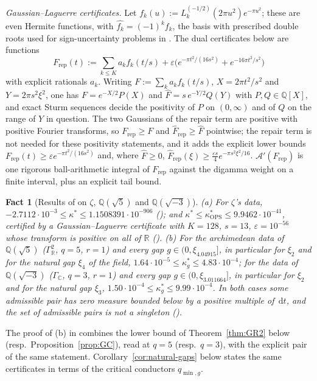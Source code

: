 \documentclass[11pt]{amsart}
\newcommand{\RR}{\mathbb R}
\newcommand{\QQ}{\mathbb Q}
\newcommand{\dd}{\,\mathrm d}
\newcommand{\eps}{\varepsilon}
\newcommand{\FT}[1]{\widehat{#1}}
\newcommand{\hF}{\widehat F}
\newcommand{\xin}[1]{\xi_{#1}}
\newcommand{\GR}{\Gamma_{\mathbb R}}
\newcommand{\GC}{\Gamma_{\mathbb C}}
\newcommand{\Arch}{\mathcal A}
\newcommand{\kstar}{\kappa^{*}}
\newcommand{\kOPS}{\kappa^{*}_{\mathrm{OPS}}}
\newcommand{\Frep}{F_{\mathrm{rep}}}
\newtheorem{fact}[theorem]{Fact}
\theoremstyle{definition}
\theoremstyle{remark}
\numberwithin{equation}{section}
\begin{document}
\emph{Gaussian--Laguerre certificates.} Let $f_k(u):=L_k^{(-1/2)}(2\pi u^2)e^{-\pi u^2}$; these are even Hermite functions, with
$\widehat{f_k}=(-1)^kf_k$, the basis with prescribed double roots used for sign-uncertainty problems in \cite{CG19}. The dual
certificates below are functions
\[
\Frep(t):=\sum_{k\le K}a_kf_k(t/s)+\eps\bigl(e^{-\pi t^2/(16s^2)}+e^{-16\pi t^2/s^2}\bigr)
\]
with explicit rationals $a_k$. Writing $F:=\sum_ka_kf_k(t/s)$, $X=2\pi t^2/s^2$ and $Y=2\pi s^2\xi^2$, one has $F=e^{-X/2}P(X)$ and
$\hF=s\,e^{-Y/2}Q(Y)$ with $P,Q\in\QQ[X]$, and exact Sturm sequences decide the positivity of $P$ on $(0,\infty)$ and of $Q$ on the
range of $Y$ in question. The two Gaussians of the repair term are positive with positive Fourier transforms, so $\Frep\ge F$
and $\FT F_{\mathrm{rep}}\ge\hF$ pointwise; the repair term is not needed for these positivity statements, and it adds the explicit
lower bounds $\Frep(t)\ge\eps e^{-\pi t^2/(16s^2)}$ and, where $\hF\ge0$, $\FT F_{\mathrm{rep}}(\xi)\ge\frac{\eps s}4e^{-\pi s^2\xi^2/16}$.
$\Arch'(\Frep)$ is one rigorous ball-arithmetic integral of $\Frep$ against the digamma weight on a finite interval, plus an
explicit tail bound.

\begin{fact}[Results of \cite{PaperI} on $\zeta$, $\QQ(\sqrt5)$ and $\QQ(\sqrt{-3})$]\label{thm:notcritical}
\textup{(a)} For $\zeta$'s data, $-2.7112\cdot10^{-3}\le\kstar\le1.1508391\cdot10^{-906}$ \textup{(}\cite[Theorem~C]{PaperI}\textup{)}; and
$\kstar\le\kOPS\le9.9462\cdot10^{-41}$, certified by a Gaussian--Laguerre certificate with $K=128$, $s=13$, $\eps=10^{-56}$ whose
transform is positive on all of $\RR$ \textup{(}\cite[Proposition~5.4]{PaperI}\textup{)}. \textup{(b)} For the archimedean data of $\QQ(\sqrt5)$
\textup{(}$\GR^2$, $q=5$, $r=1$\textup{)} and every gap $g\in(0,\xin{4.04915}]$, in particular for $\xin2$ and for the natural gap $\xin4$ of the
field, $1.64\cdot10^{-5}\le\kstar_g\le4.83\cdot10^{-4}$; for the data of $\QQ(\sqrt{-3})$ \textup{(}$\GC$, $q=3$, $r=1$\textup{)} and every gap
$g\in(0,\xin{3.011664}]$, in particular for $\xin2$ and for the natural gap $\xin3$, $1.50\cdot10^{-4}\le\kstar_g\le9.99\cdot10^{-4}$. In both cases
some admissible pair has zero measure bounded below by a positive multiple of $\dd t$, and the set of admissible pairs is not a
singleton \textup{(}\cite[Proposition~5.10]{PaperI}\textup{)}.
\end{fact}

The proof of (b) in \cite{PaperI} combines the lower bound of Theorem~\ref{thm:GR2} below (resp.\ Proposition~\ref{prop:GC}), read at
$q=5$ (resp.\ $q=3$), with the explicit pair of the same statement. Corollary~\ref{cor:natural-gaps} below states the same certificates
in terms of the critical conductors $q_{\min,g}$.
\end{document}
